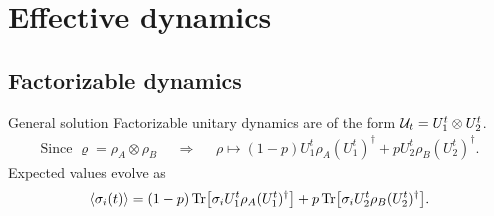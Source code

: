 \section{Effective dynamics}

\subsection{Factorizable dynamics}

\begin{frame}{General solution}
    Factorizable unitary dynamics are of the form $\mathcal{U}_{t}=U_{1}^{t}\otimes U_{2}^{t}$.
    \begin{align*}
        \text{Since } \varrho=\rho_{A}\otimes\rho_{B} & & \Longrightarrow & &\rho\mapsto (1-p)U_{1}^{t}\rho_{A}(U_{1}^{t})^{\dag}+pU_{2}^{t}\rho_{B} (U_{2}^{t})^{\dag}.
    \end{align*}
    Expected values evolve as
    \begin{equation*}
            \expval{\sigma_{i}(t)}=(1-p)\Tr[\sigma_{i}U_{1}^{t}\rho_{A}(U_{1}^{t})^{\dag}]+p\Tr[\sigma_{i}U_{2}^{t}\rho_{B}(U_{2}^{t})^{\dag}].
      \end{equation*}
\end{frame}



